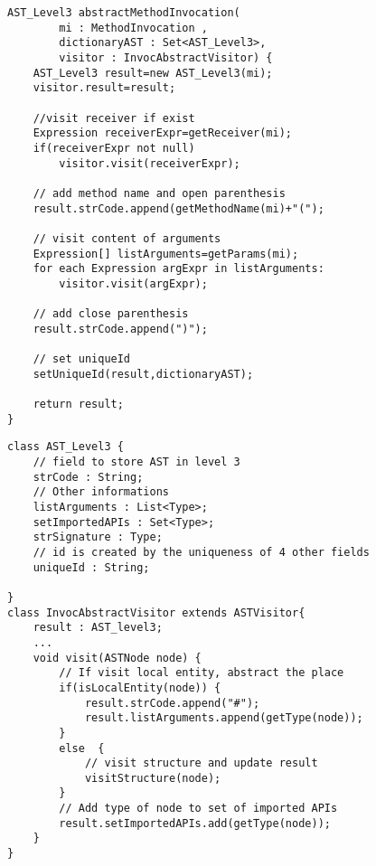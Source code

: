 \begin{minipage}[c]{0.45\textwidth}
\begin{lstlisting}[basicstyle=\tiny,caption={Algorithm for Method Invocation Abstraction},label={lt:AlgorithmMethodAbstractor}]
AST_Level3 abstractMethodInvocation(
		mi : MethodInvocation ,
		dictionaryAST : Set<AST_Level3>,
		visitor : InvocAbstractVisitor) {
	AST_Level3 result=new AST_Level3(mi);		
	visitor.result=result;
	
	//visit receiver if exist
	Expression receiverExpr=getReceiver(mi);		
	if(receiverExpr not null)
		visitor.visit(receiverExpr);
	
	// add method name and open parenthesis
	result.strCode.append(getMethodName(mi)+"(");
	
	// visit content of arguments
	Expression[] listArguments=getParams(mi);		
	for each Expression argExpr in listArguments:
		visitor.visit(argExpr);
	
	// add close parenthesis
	result.strCode.append(")");

	// set uniqueId
	setUniqueId(result,dictionaryAST);
	
	return result;		
}

\end{lstlisting}
\end{minipage}\hfill
\begin{minipage}[c]{0.45\textwidth}
\begin{lstlisting}[basicstyle=\tiny,caption={Definition of AST\_Level3 and InvocAbstractVisitor for collect information of MI},label={lt:AlgorithmMethodAbstractorPartB}]
class AST_Level3 {
	// field to store AST in level 3
	strCode : String;
	// Other informations
	listArguments : List<Type>;
	setImportedAPIs : Set<Type>;	
	strSignature : Type;
	// id is created by the uniqueness of 4 other fields 
	uniqueId : String;
	
}
class InvocAbstractVisitor extends ASTVisitor{
	result : AST_level3;
	...		
	void visit(ASTNode node) {
		// If visit local entity, abstract the place
		if(isLocalEntity(node)) {
			result.strCode.append("#");
			result.listArguments.append(getType(node));				
		} 
		else  {	
			// visit structure and update result
			visitStructure(node);
		} 			
		// Add type of node to set of imported APIs
		result.setImportedAPIs.add(getType(node));		
	}	
}
\end{lstlisting}

\end{minipage}\hfill


